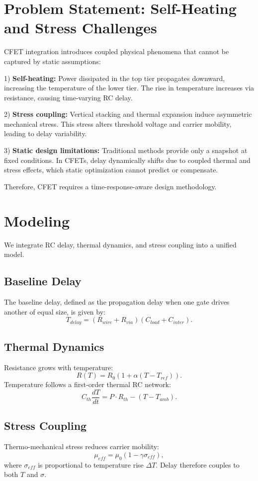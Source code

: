 \documentclass[conference]{IEEEtran}
\begin{document}
\section{Problem Statement: Self-Heating and Stress Challenges}
CFET integration introduces coupled physical phenomena that cannot be captured by static assumptions:  

1) \textbf{Self-heating:} Power dissipated in the top tier propagates downward, increasing the temperature of the lower tier. The rise in temperature increases via resistance, causing time-varying RC delay.  

2) \textbf{Stress coupling:} Vertical stacking and thermal expansion induce asymmetric mechanical stress. This stress alters threshold voltage and carrier mobility, leading to delay variability.  

3) \textbf{Static design limitations:} Traditional methods provide only a snapshot at fixed conditions. In CFETs, delay dynamically shifts due to coupled thermal and stress effects, which static optimization cannot predict or compensate.  

Therefore, CFET requires a time-response-aware design methodology.

\section{Modeling}
We integrate RC delay, thermal dynamics, and stress coupling into a unified model.  

\subsection{Baseline Delay}
The baseline delay, defined as the propagation delay when one gate drives another of equal size, is given by:
\[
T_{delay} = (R_{wire} + R_{via})(C_{load} + C_{inter}).
\]

\subsection{Thermal Dynamics}
Resistance grows with temperature:
\[
R(T) = R_0 \left(1 + \alpha (T - T_{ref}) \right).
\]
Temperature follows a first-order thermal RC network:
\[
C_{th}\frac{dT}{dt} = P\cdot R_{th} - (T - T_{amb}).
\]

\subsection{Stress Coupling}
Thermo-mechanical stress reduces carrier mobility:
\[
\mu_{eff} = \mu_0 (1 - \gamma \sigma_{eff}),
\]
where $\sigma_{eff}$ is proportional to temperature rise $\Delta T$. Delay therefore couples to both $T$ and $\sigma$.
\end{document}
